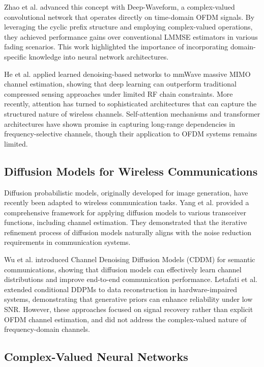 \documentclass[conference]{IEEEtran}
\begin{document}
Zhao et al. \cite{zhao2021deepwaveform} advanced this concept with Deep-Waveform, a complex-valued convolutional network that operates directly on time-domain OFDM signals. By leveraging the cyclic prefix structure and employing complex-valued operations, they achieved performance gains over conventional LMMSE estimators in various fading scenarios. This work highlighted the importance of incorporating domain-specific knowledge into neural network architectures.

He et al. \cite{he2019deep} applied learned denoising-based networks to mmWave massive MIMO channel estimation, showing that deep learning can outperform traditional compressed sensing approaches under limited RF chain constraints. More recently, attention has turned to sophisticated architectures that can capture the structured nature of wireless channels. Self-attention mechanisms and transformer architectures have shown promise in capturing long-range dependencies in frequency-selective channels, though their application to OFDM systems remains limited.

\subsection{Diffusion Models for Wireless Communications}

Diffusion probabilistic models, originally developed for image generation, have recently been adapted to wireless communication tasks. Yang et al. \cite{yang2025diffusion} provided a comprehensive framework for applying diffusion models to various transceiver functions, including channel estimation. They demonstrated that the iterative refinement process of diffusion models naturally aligns with the noise reduction requirements in communication systems.

Wu et al. \cite{wu2023cddm} introduced Channel Denoising Diffusion Models (CDDM) for semantic communications, showing that diffusion models can effectively learn channel distributions and improve end-to-end communication performance. Letafati et al. \cite{letafati2023conditional} extended conditional DDPMs to data reconstruction in hardware-impaired systems, demonstrating that generative priors can enhance reliability under low SNR. However, these approaches focused on signal recovery rather than explicit OFDM channel estimation, and did not address the complex-valued nature of frequency-domain channels.

\subsection{Complex-Valued Neural Networks}
\end{document}
